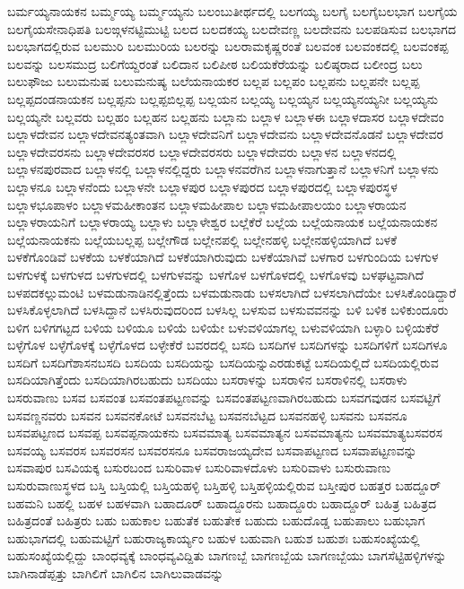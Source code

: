 {ಬರ್ಮಯ್ಯನಾಯಕನ
ಬರ್ಮ್ಮಯ್ಯ
ಬರ್ಮ್ಮಯ್ಯನು
ಬಲಂಬುತೀರ್ಥದಲ್ಲಿ
ಬಲಗಯ್ಯ
ಬಲಗೈ
ಬಲಗೈಬಲಭಾಗ
ಬಲಗೈಯ
ಬಲಗೈಯಸೇನಾಧಿಪತಿ
ಬಲಙ್ಗಳನಟ್ಟಿಮುಟ್ಟಿ
ಬಲದ
ಬಲದಕಯ್ಯ
ಬಲದೇವಣ್ಣ
ಬಲದೇವನು
ಬಲಪಡಿಸುವ
ಬಲಭಾಗದ
ಬಲಭಾಗದಲ್ಲಿರುವ
ಬಲಮುರಿ
ಬಲಮುರಿಯ
ಬಲರನ್ನು
ಬಲರಾಮಕೃಷ್ಣರಂತೆ
ಬಲವಂಕ
ಬಲವಂಕದಲ್ಲಿ
ಬಲವಂಕಪ್ಪ
ಬಲವನ್ನು
ಬಲಸಮುದ್ರ
ಬಲಿಗೆಯ್ದರಂತೆ
ಬಲಿದಾನ
ಬಲಿಪೀಠ
ಬಲಿಯಕೆರೆಯನ್ನು
ಬಲಿಷ್ಠರಾದ
ಬಲೀಂದ್ರ
ಬಲು
ಬಲುಫೌಜು
ಬಲುಮನುಷ
ಬಲುಮನುಷ್ಯ
ಬಲೆಯನಾಯಕರ
ಬಲ್ಲಪ
ಬಲ್ಲಪಂ
ಬಲ್ಲಪನು
ಬಲ್ಲಪನೇ
ಬಲ್ಲಪ್ಪ
ಬಲ್ಲಪ್ಪದಂಡನಾಯಕನ
ಬಲ್ಲಪ್ಪನು
ಬಲ್ಲಪ್ಪಬಿಲ್ಲಪ್ಪ
ಬಲ್ಲಯನ
ಬಲ್ಲಯ್ಯ
ಬಲ್ಲಯ್ಯನ
ಬಲ್ಲಯ್ಯನಯ್ಯನೀ
ಬಲ್ಲಯ್ಯನು
ಬಲ್ಲಯ್ಯನೇ
ಬಲ್ಲವರು
ಬಲ್ಲಹಂ
ಬಲ್ಲಹನ
ಬಲ್ಲಹನು
ಬಲ್ಲಾನು
ಬಲ್ಲಾಳ
ಬಲ್ಲಾಳಈ
ಬಲ್ಲಾಳದಾಸರ
ಬಲ್ಲಾಳದೇವಂ
ಬಲ್ಲಾಳದೇವನ
ಬಲ್ಲಾಳದೇವನತ್ಯಂತವಾಗಿ
ಬಲ್ಲಾಳದೇವನಿಗೆ
ಬಲ್ಲಾಳದೇವನು
ಬಲ್ಲಾಳದೇವನೊಡನೆ
ಬಲ್ಲಾಳದೇವರ
ಬಲ್ಲಾಳದೇವರಸನು
ಬಲ್ಲಾಳದೇವರಸರ
ಬಲ್ಲಾಳದೇವರಸರು
ಬಲ್ಲಾಳದೇವರು
ಬಲ್ಲಾಳನ
ಬಲ್ಲಾಳನದಲ್ಲಿ
ಬಲ್ಲಾಳನಪುರವಾದ
ಬಲ್ಲಾಳನಲ್ಲಿ
ಬಲ್ಲಾಳನಲ್ಲಿದ್ದರು
ಬಲ್ಲಾಳನವರೆಗಿನ
ಬಲ್ಲಾಳನಾಗುತ್ತಾನೆ
ಬಲ್ಲಾಳನಿಗೆ
ಬಲ್ಲಾಳನು
ಬಲ್ಲಾಳನೂ
ಬಲ್ಲಾಳನೆಂದು
ಬಲ್ಲಾಳನೇ
ಬಲ್ಲಾಳಪುರ
ಬಲ್ಲಾಳಪುರದ
ಬಲ್ಲಾಳಪುರದಲ್ಲಿ
ಬಲ್ಲಾಳಪುರಸ್ಥಳ
ಬಲ್ಲಾಳಭೂಪಾಳಂ
ಬಲ್ಲಾಳಮಹೀಕಾಂತನ
ಬಲ್ಲಾಳಮಹೀಪಾಲ
ಬಲ್ಲಾಳಮಹೀಪಾಲಯಂ
ಬಲ್ಲಾಳರಾಯನ
ಬಲ್ಲಾಳರಾಯನಿಗೆ
ಬಲ್ಲಾಳರಾಯ್ಯ
ಬಲ್ಲಾಳು
ಬಲ್ಲಾಳೇಶ್ವರ
ಬಲ್ಲೆಕೆರೆ
ಬಲ್ಲೆಯ
ಬಲ್ಲೆಯನಾಯಕ
ಬಲ್ಲೆಯನಾಯಕನ
ಬಲ್ಲೆಯನಾಯಕನು
ಬಲ್ಲೆಯಬಲ್ಲಪ್ಪ
ಬಲ್ಲೇಗೌಡ
ಬಲ್ಲೇನಪಲ್ಲಿ
ಬಲ್ಲೇನಹಳ್ಳಿ
ಬಲ್ಲೇನಹಳ್ಳಿಯಾಗಿದೆ
ಬಳಕೆ
ಬಳಕೆಗೊಂಡಿವೆ
ಬಳಕೆಯ
ಬಳಕೆಯಾಗಿದೆ
ಬಳಕೆಯಾಗಿರುವುದು
ಬಳಕೆಯಾಗಿವೆ
ಬಳಗಾರ
ಬಳಗುಂದಿಯ
ಬಳಗುಳ
ಬಳಗುಳಕ್ಕೆ
ಬಳಗುಳದ
ಬಳಗುಳದಲ್ಲಿ
ಬಳಗುಳವನ್ನು
ಬಳಗೊಳ
ಬಳಗೊಳದಲ್ಲಿ
ಬಳಗೊಳವು
ಬಳಘಟ್ಟವಾಗಿದೆ
ಬಳಪದಕಲ್ಲುಮಂಟಿ
ಬಳಮಡುನಾಡಿನಲ್ಲಿತ್ತೆಂದು
ಬಳಮಡುನಾಡು
ಬಳಸಲಾಗಿದೆ
ಬಳಸಲಾಗಿದೆಯೇ
ಬಳಸಿಕೊಂಡಿದ್ದಾರೆ
ಬಳಸಿಕೊಳ್ಳಲಾಗಿದೆ
ಬಳಸಿದ್ದಾನೆ
ಬಳಸಿರುವುದರಿಂದ
ಬಳಸಿಲ್ಲ
ಬಳಸುವ
ಬಳಸುವವನನ್ನು
ಬಳಿ
ಬಳಿಕ
ಬಳಿಕುಂದೂರು
ಬಳಿಗ
ಬಳಿಗಗಟ್ಟದ
ಬಳಿಯ
ಬಳಿಯೂ
ಬಳಿಯೆ
ಬಳಿಯೇ
ಬಳುವಳಿಯಾಗಲ್ಲ
ಬಳುವಳಿಯಾಗಿ
ಬಳ್ಳಾರಿ
ಬಳ್ಳಿಯಕೆರೆ
ಬಳ್ಳೆಗೊಳ
ಬಳ್ಳೆಗೊಳಕ್ಕೆ
ಬಳ್ಳೆಗೊಳದ
ಬಳ್ಳೇಕೆರೆ
ಬವರದಲ್ಲಿ
ಬಸದಿ
ಬಸದಿಗಳ
ಬಸದಿಗಳನ್ನು
ಬಸದಿಗಳಿಗೆ
ಬಸದಿಗಳೂ
ಬಸದಿಗೆ
ಬಸದಿಗೆಶಾಸನಬಸದಿ
ಬಸದಿಯ
ಬಸದಿಯನ್ನು
ಬಸದಿಯನ್ನುಎರಡುಕಟ್ಟೆ
ಬಸದಿಯಲ್ಲಿದೆ
ಬಸದಿಯಲ್ಲಿರುವ
ಬಸದಿಯಾಗಿತ್ತೆಂದು
ಬಸದಿಯಾಗಿರಬಹುದು
ಬಸದಿಯು
ಬಸರಾಳನ್ನು
ಬಸರಾಳಿನ
ಬಸರಾಳಿನಲ್ಲಿ
ಬಸರಾಳು
ಬಸರುವಾಣು
ಬಸವ
ಬಸವಂತ
ಬಸವಂತಪಟ್ಟಣವನ್ನು
ಬಸವಂತಪಟ್ಟಣವಾಗಿರಬಹುದು
ಬಸವಗವುಡನ
ಬಸವಟ್ಟಿಗೆ
ಬಸವಣ್ಣನವರು
ಬಸವನ
ಬಸವನಕೋಟೆ
ಬಸವನಬೆಟ್ಟ
ಬಸವನಬೆಟ್ಟದ
ಬಸವನಹಳ್ಳಿ
ಬಸವನು
ಬಸವನೂ
ಬಸವಪಟ್ಟಣದ
ಬಸವಪ್ಪ
ಬಸವಪ್ಪನಾಯಕನು
ಬಸವಮಾತ್ಯ
ಬಸವಮಾತ್ಯನ
ಬಸವಮಾತ್ಯನು
ಬಸವಮಾತ್ಯಬಸವರಸ
ಬಸವಯ್ಯ
ಬಸವರಸ
ಬಸವರಸನ
ಬಸವರಸನೂ
ಬಸವರಾಜಯ್ಯದೇವ
ಬಸವಾಪಟ್ಟಣದ
ಬಸವಾಪಟ್ಟಣವನ್ನು
ಬಸವಾಪುರ
ಬಸವಿಯಕ್ಕ
ಬಸುರಬಂದ
ಬಸುರಿವಾಳ
ಬಸುರಿವಾಳದೊಳು
ಬಸುರಿವಾಳು
ಬಸುರುವಾಣು
ಬಸುರುವಾಣುಸ್ಥಳದ
ಬಸ್ತಿ
ಬಸ್ತಿಯಲ್ಲಿ
ಬಸ್ತಿಯಹಳ್ಳಿ
ಬಸ್ತಿಹಳ್ಳಿ
ಬಸ್ತಿಹಳ್ಳಿಯಲ್ಲಿರುವ
ಬಸ್ತೀಪುರ
ಬಹತ್ತರ
ಬಹದ್ದೂರ್
ಬಹಮನಿ
ಬಹಲ್ಲಿ
ಬಹಳ
ಬಹಳವಾಗಿ
ಬಹಾದೂರ್
ಬಹಾದ್ದೂರನು
ಬಹಾದ್ದೂರು
ಬಹಾದ್ದೂರ್
ಬಹಿತ್ರ
ಬಹಿತ್ರದ
ಬಹಿತ್ರದಂತೆ
ಬಹಿತ್ರರು
ಬಹು
ಬಹುಕಾಲ
ಬಹುತೆಕ
ಬಹುತೇಕ
ಬಹುದು
ಬಹುದೊಡ್ಡ
ಬಹುಪಾಲು
ಬಹುಭಾಗ
ಬಹುಭಾಗದಲ್ಲಿ
ಬಹುಮಟ್ಟಿಗೆ
ಬಹುರಾಜ್ಯಕಾರ್ಯ್ಯಂ
ಬಹುಳ
ಬಹುವಾಗಿ
ಬಹುಶ
ಬಹುಶಃ
ಬಹುಸಂಖ್ಯೆಯಲ್ಲಿ
ಬಹುಸಂಖ್ಯೆಯಲ್ಲಿದ್ದು
ಬಾಂಧವ್ಯಕ್ಕೆ
ಬಾಂಧವ್ಯವಿದ್ದಿತು
ಬಾಗಣಬ್ಬೆ
ಬಾಗಣಬ್ಬೆಯ
ಬಾಗಣಬ್ಬೆಯು
ಬಾಗಸೆಟ್ಟಿಹಳ್ಳಿಗಳನ್ನು
ಬಾಗಿನಾಡೆಪ್ಪತ್ತು
ಬಾಗಿಲಿಗೆ
ಬಾಗಿಲಿನ
ಬಾಗಿಲುವಾಡವನ್ನು
}
